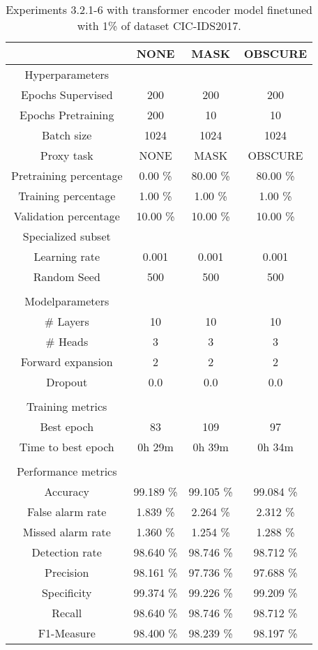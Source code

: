 \begin{table}[htb]
    \centering
    \begin{tabular}{@{}cccc@{}}
        \toprule
         &  NONE &  MASK &  OBSCURE \\
        \midrule
        Hyperparameters &  &  &  \\
        Epochs Supervised &  200 &  200 &  200 \\
        Epochs Pretraining &  200 &  10 &  10 \\
        Batch size &  1024 &  1024 &  1024 \\
        Proxy task &  NONE &  MASK &  OBSCURE \\
        Pretraining percentage &  0.00 \% &  80.00 \% &  80.00 \% \\
        Training percentage &  1.00 \% &  1.00 \% &  1.00 \% \\
        Validation percentage &  10.00 \% &  10.00 \% &  10.00 \% \\
        Specialized subset &   &   &   \\
        Learning rate &  0.001 &  0.001 &  0.001 \\
        Random Seed &  500 &  500 &  500 \\
         \\
        Modelparameters &  &  &  \\
        \# Layers &  10 &  10 &  10 \\
        \# Heads &  3 &  3 &  3 \\
        Forward expansion &  2 &  2 &  2 \\
        Dropout &  0.0 &  0.0 &  0.0 \\
         \\
        Training metrics &  &  &  \\
        Best epoch &  83 &  109 &  97 \\
        Time to best epoch &  0h 29m &  0h 39m &  0h 34m \\
         \\
        Performance metrics &  &  &  \\
        Accuracy &  99.189 \% &  99.105 \% &  99.084 \% \\
        False alarm rate &  1.839 \% &  2.264 \% &  2.312 \% \\
        Missed alarm rate &  1.360 \% &  1.254 \% &  1.288 \% \\
        Detection rate &  98.640 \% &  98.746 \% &  98.712 \% \\
        Precision &  98.161 \% &  97.736 \% &  97.688 \% \\
        Specificity &  99.374 \% &  99.226 \% &  99.209 \% \\
        Recall &  98.640 \% &  98.746 \% &  98.712 \% \\
        F1-Measure &  98.400 \% &  98.239 \% &  98.197 \% \\
        \bottomrule
    \end{tabular}
    \caption{Experiments 3.2.1-6 with transformer encoder model finetuned with 1\% of dataset CIC-IDS2017.}
    \label{table:results:lstm:stats_flows_1}
\end{table}